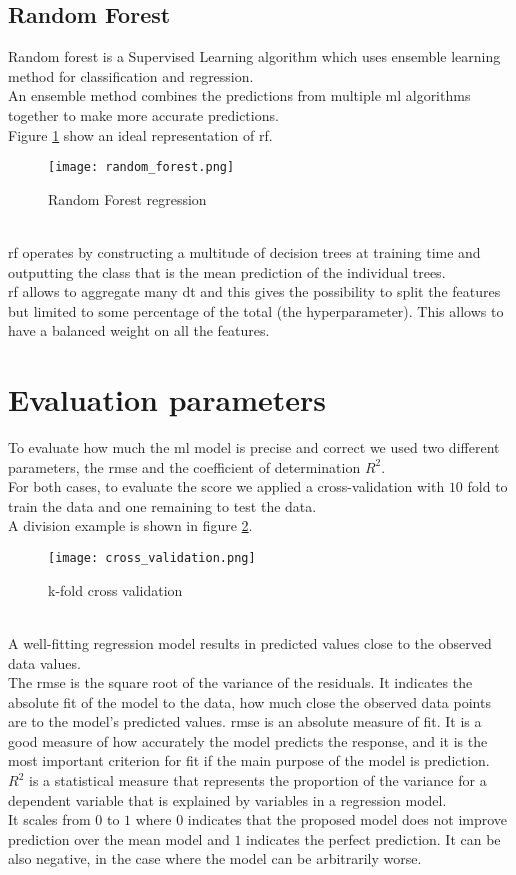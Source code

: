 \subsection{Random Forest}
Random forest is a Supervised Learning algorithm which uses ensemble learning method for classification and regression.
\\
An ensemble method combines the predictions from multiple \gls{ml} algorithms together to make more accurate predictions.
\\
Figure \ref{fig:random_forest} show an ideal representation of \gls{rf}.
\begin{figure}[h]
    \centering
    \texttt{[image: random\_forest.png]} 
	\caption{Random Forest regression}
    \label{fig:random_forest}
\end{figure} 
\\
\gls{rf} operates by constructing a multitude of decision trees at training time and outputting the class that is the mean prediction of the individual trees.
\\
\gls{rf} allows to aggregate many \gls{dt} and this gives the possibility to split the features but limited to some percentage of the total (the hyperparameter). This allows to have a balanced weight on all the features.

\section{Evaluation parameters}
To evaluate how much the \gls{ml} model is precise and correct we used two different parameters, the \gls{rmse} and the coefficient of determination $R^2$.
\\ \indent
For both cases, to evaluate the score we applied a cross-validation with $10$ fold to train the data and one remaining to test the data.
\\
A division example is shown in figure \ref{fig:cross_validation}.
\begin{figure}[h]
    \centering
    \texttt{[image: cross\_validation.png]} 
	\caption{k-fold cross validation}
    \label{fig:cross_validation}
\end{figure} 
\\
A well-fitting regression model results in predicted values close to the observed data values.
\\
The \gls{rmse} is the square root of the variance of the residuals. It indicates the absolute fit of the model to the data, how much close the observed data points are to the model's predicted values. \gls{rmse} is an absolute measure of fit. It is a good measure of how accurately the model predicts the response, and it is the most important criterion for fit if the main purpose of the model is prediction.
\\ \indent
$R^2$ is a statistical measure that represents the proportion of the variance for a dependent variable that is explained by variables in a regression model.
\\
It scales from $0$ to $1$ where $0$ indicates that the proposed model does not improve prediction over the mean model and $1$ indicates the perfect prediction. It can be also negative, in the case where the model can be arbitrarily worse.